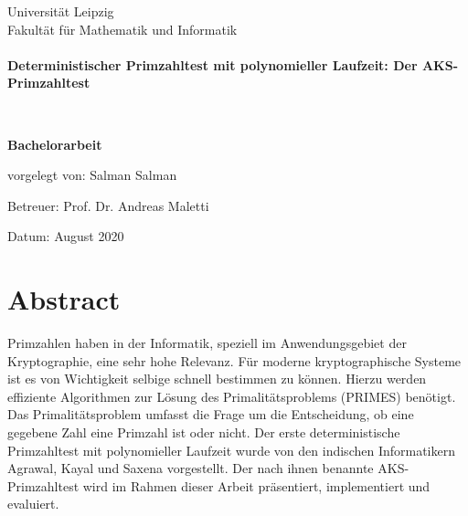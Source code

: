 \documentclass[12pt,oneside]{article}
\theoremstyle{remark}
\theoremstyle{definition}
\begin{document}
\begin{titlepage}
\begin{center}

\textnormal{\LARGE Universität Leipzig \\
Fakultät für Mathematik 
und Informatik}\\[0.5cm]

\HRule \\[0.4cm]
{ \huge \bfseries Deterministischer Primzahltest mit polynomieller Laufzeit: Der AKS-Primzahltest \\[0.4cm] }

\HRule \\[1.5cm]

\begin{minipage}{0.8\textwidth}
\centering
\LARGE{
\textbf{Bachelorarbeit}
}
\end{minipage}

\vspace{3cm}


\begin{flushleft}
\Large{
vorgelegt von: Salman Salman
\vspace{0.5cm}

Betreuer: Prof. Dr. Andreas Maletti

\vspace{0.5cm}
Datum: August 2020

}
\end{flushleft}

\end{center}
\end{titlepage}
\lhead{}
    \setcounter{page}{1}

\tableofcontents
\clearpage



\setlength{\parskip}{0.5em} 
\section*{Abstract}
Primzahlen haben in der Informatik, speziell im Anwendungsgebiet der Kryptographie, eine sehr hohe Relevanz. Für moderne kryptographische Systeme ist es von Wichtigkeit selbige schnell bestimmen zu können. Hierzu werden effiziente Algorithmen zur Lösung des Primalitätsproblems (PRIMES) benötigt. Das Primalitätsproblem umfasst die Frage um die Entscheidung, ob eine gegebene Zahl eine Primzahl ist oder nicht. Der erste deterministische Primzahltest mit polynomieller Laufzeit wurde von den indischen Informatikern Agrawal, Kayal und Saxena vorgestellt. Der nach ihnen benannte AKS-Primzahltest wird im Rahmen dieser Arbeit präsentiert, implementiert und evaluiert.  
\end{document}
